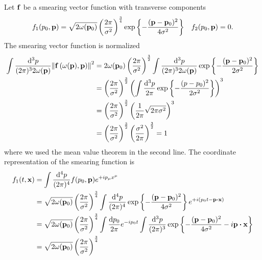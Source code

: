 \begin{example}
	Let $\vb{f}$ be a smearing vector function with transverse components
	\begin{align*}
		f_1(p_0,\vb{p})
		=
		\sqrt{2\omega(\vb{p}_0)}
		\left(\frac{2\pi}{\sigma^2}\right)^{\frac{3}{4}}
		\exp\left\{
			-
			\frac{(\vb{p}-\vb{p}_0)^2}{4\sigma^2}
		\right\}
		&&
		f_2(p_0,\vb{p})
		=
		0
		.
	\end{align*}
	The smearing vector function is normalized
	\begin{equation*}
		\begin{split}
			\int\frac{\dd[3]{p}}{(2\pi)^32\omega(\vb{p})}
			\norm{\vb{f}\left(\omega(\vb{p}),\vb{p}\right)}^2
			&=
			2\omega(\vb{p}_0)
			\left(\frac{2\pi}{\sigma^2}\right)^{\frac{3}{2}}
			\int\frac{\dd[3]{p}}{(2\pi)^32\omega(\vb{p})}
			\exp\left\{
				-
				\frac{(\vb{p}-\vb{p}_0)^2}{2\sigma^2}
			\right\}
			\\
			&=
			\left(\frac{2\pi}{\sigma^2}\right)^{\frac{3}{2}}
			\left(
				\int\frac{\dd[3]{p}}{2\pi}
				\exp\left\{
					-
					\frac{(p-p_0)^2}{2\sigma^2}
				\right\}
			\right)^3
			\\
			&=
			\left(\frac{2\pi}{\sigma^2}\right)^{\frac{3}{2}}
			\left(
				\frac{1}{2\pi}
				\sqrt{2\pi\sigma^2}
			\right)^3
			\\
			&=
			\left(\frac{2\pi}{\sigma^2}\right)^{\frac{3}{2}}
			\left(
				\frac{\sigma^2}{2\pi}
			\right)^{\frac{3}{2}}
			=
			1
		\end{split}
	\end{equation*}
	where we used the mean value theorem in the second line.
	The coordinate representation of the smearing function is
	\begin{equation*}
		\begin{split}
			f_1(t,\vb{x})
			&=
			\int\frac{\dd[4]{p}}{(2\pi)^4}
			f(p_0,\vb{p})
			e^{+ip_\mu x^\mu}
			\\
			&=
			\sqrt{2\omega(\vb{p}_0)}
			\left(\frac{2\pi}{\sigma^2}\right)^{\frac{3}{4}}
			\int\frac{\dd[4]{p}}{(2\pi)^4}
			\exp\left\{
				-
				\frac{(\vb{p}-\vb{p}_0)^2}{4\sigma^2}
			\right\}
			e^{+i(p_0t-\vb{p}\vdot\vb{x})}
			\\
			&=
			\sqrt{2\omega(\vb{p}_0)}
			\left(\frac{2\pi}{\sigma^2}\right)^{\frac{3}{4}}
			\int\frac{\dd{p_0}}{2\pi}
			e^{-ip_0t}
			\int\frac{\dd[3]{p}}{(2\pi)^3}
			\exp\left\{
				-
				\frac{(\vb{p}-\vb{p}_0)^2}{4\sigma^2}
				-
				i\vb{p}\vdot\vb{x}
			\right\}
			\\
			&=
			\sqrt{2\omega(\vb{p}_0)}
			\left(\frac{2\pi}{\sigma^2}\right)^{\frac{3}{4}}

\end{split}
\end{equation*}
\end{example}
